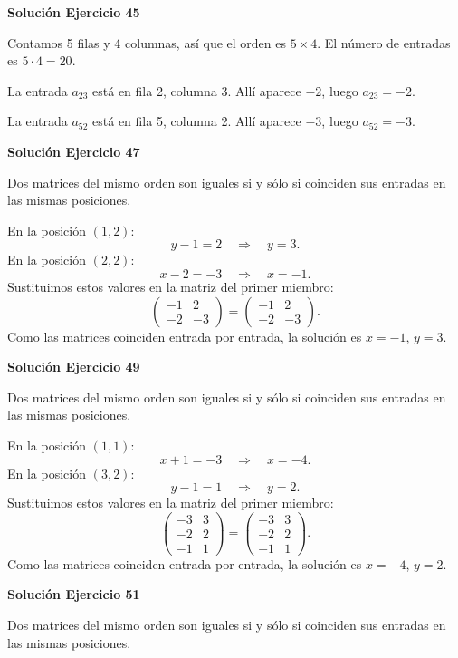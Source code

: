\par\bigskip\noindent\textbf{Solución Ejercicio 45}\par\nobreak
Contamos 5 filas y 4 columnas, así que el orden es $5\times4$. El número de entradas es $5\cdot 4=20$.

La entrada $a_{23}$ está en fila 2, columna 3. Allí aparece $-2$, luego $\boxed{a_{23}=-2}$.

La entrada $a_{52}$ está en fila 5, columna 2. Allí aparece $-3$, luego $\boxed{a_{52}=-3}$.


\par\bigskip\noindent\textbf{Solución Ejercicio 47}\par\nobreak
Dos matrices del mismo orden son iguales si y sólo si coinciden sus entradas en las mismas posiciones.

En la posición $(1,2)$:
\[
y - 1=2\quad\Longrightarrow\quad y=3.
\]
En la posición $(2,2)$:
\[
x - 2=-3\quad\Longrightarrow\quad x=-1.
\]
Sustituimos estos valores en la matriz del primer miembro:
\[
\begin{pmatrix}-1&2\\-2&-3\end{pmatrix}=\begin{pmatrix}-1&2\\-2&-3\end{pmatrix}.
\]
Como las matrices coinciden entrada por entrada, la solución es $x=-1$, $y=3$.


\par\bigskip\noindent\textbf{Solución Ejercicio 49}\par\nobreak
Dos matrices del mismo orden son iguales si y sólo si coinciden sus entradas en las mismas posiciones.

En la posición $(1,1)$:
\[
x + 1=-3\quad\Longrightarrow\quad x=-4.
\]
En la posición $(3,2)$:
\[
y - 1=1\quad\Longrightarrow\quad y=2.
\]
Sustituimos estos valores en la matriz del primer miembro:
\[
\begin{pmatrix}-3&3\\-2&2\\-1&1\end{pmatrix}=\begin{pmatrix}-3&3\\-2&2\\-1&1\end{pmatrix}.
\]
Como las matrices coinciden entrada por entrada, la solución es $x=-4$, $y=2$.


\par\bigskip\noindent\textbf{Solución Ejercicio 51}\par\nobreak
Dos matrices del mismo orden son iguales si y sólo si coinciden sus entradas en las mismas posiciones.


